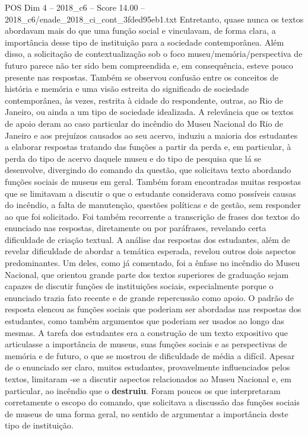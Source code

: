\begin{textsample}{POS Dim 4 – 2018\_c6 – Score 14.00 – 2018\_c6/enade\_2018\_ci\_cont\_3fded95eb1.txt}
Entretanto, quase nunca os textos abordavam mais do que uma função social e vinculavam, de forma clara, a importância desse tipo de instituição para a sociedade contemporânea.
Além disso, a solicitação de contextualização sob o foco museu/memória/perspectiva de futuro parece não ter sido bem compreendida e, em consequência, esteve pouco presente nas respostas.
Também se observou confusão entre os conceitos de história e memória e uma visão estreita do significado de sociedade contemporânea, às vezes, restrita à cidade do respondente, outras, ao Rio de Janeiro, ou ainda a um tipo de sociedade idealizada.
A relevância que os textos de apoio deram ao caso particular do incêndio do Museu Nacional do Rio de Janeiro e aos prejuízos causados ao seu acervo, induziu a maioria dos estudantes a elaborar respostas tratando das funções a partir da perda e, em particular, à perda do tipo de acervo daquele museu e do tipo de pesquisa que lá se desenvolve, divergindo do comando da questão, que solicitava texto abordando funções sociais de museus em geral.
Também foram encontradas muitas respostas que se limitavam a discutir o que o estudante considerava como possíveis causas do incêndio, a falta de manutenção, questões políticas e de gestão, sem responder ao que foi solicitado.
Foi também recorrente a transcrição de frases dos textos do enunciado nas respostas, diretamente ou por paráfrases, revelando certa dificuldade de criação textual.
A análise das respostas dos estudantes, além de revelar dificuldade de abordar a temática esperada, revelou outros dois aspectos predominantes.
Um deles, como já comentado, foi a ênfase no incêndio do Museu Nacional, que orientou grande parte dos textos superiores de graduação sejam capazes de discutir funções de instituições sociais, especialmente porque o enunciado trazia fato recente e de grande repercussão como apoio.
O padrão de resposta elencou as funções sociais que poderiam ser abordadas nas respostas dos estudantes, como também argumentos que poderiam ser usados ao longo das mesmas.
A tarefa dos estudantes era a construção de um texto expositivo que articulasse a importância de museus, suas funções sociais e as perspectivas de memória e de futuro, o que se mostrou de dificuldade de média a difícil.
Apesar de o enunciado ser claro, muitos estudantes, provavelmente influenciados pelos textos, limitaram -se a discutir aspectos relacionados ao Museu Nacional e, em particular, ao incêndio que o \textbf{destruiu}.
Foram poucos os que interpretaram corretamente o escopo do comando, que solicitava a discussão das funções sociais de museus de uma forma geral, no sentido de argumentar a importância deste tipo de instituição.

\end{textsample}
